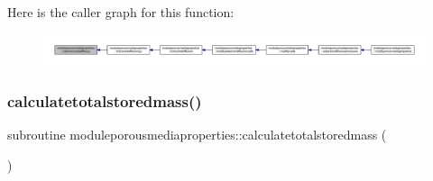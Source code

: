 Here is the caller graph for this function\+:\nopagebreak
\begin{figure}[H]
\begin{center}
\leavevmode
\includegraphics[width=350pt]{namespacemoduleporousmediaproperties_a060f429ecbcbfc17419b00ac5e09e9de_icgraph}
\end{center}
\end{figure}
\mbox{\label{namespacemoduleporousmediaproperties_a39cd5689166d641ddb0f961d291c6061}} 
\subsubsection{\texorpdfstring{calculatetotalstoredmass()}{calculatetotalstoredmass()}}
{\footnotesize\ttfamily subroutine moduleporousmediaproperties\+::calculatetotalstoredmass (\begin{DoxyParamCaption}{ }\end{DoxyParamCaption})\hspace{0.3cm}{\ttfamily [private]}}

